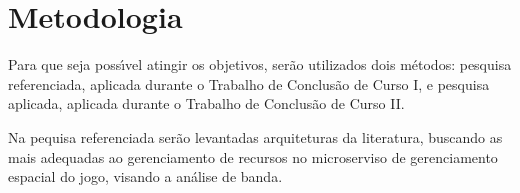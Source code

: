 \section{Metodologia}
\label{met}

Para que seja possı́vel atingir os objetivos, serão utilizados dois métodos: pesquisa referenciada, aplicada durante o Trabalho de Conclusão de Curso I, e pesquisa aplicada, aplicada durante o Trabalho de Conclusão de Curso II.

Na pequisa referenciada serão levantadas arquiteturas da literatura, buscando as mais adequadas ao gerenciamento de recursos no microserviso de gerenciamento espacial do jogo, visando a análise de banda.
